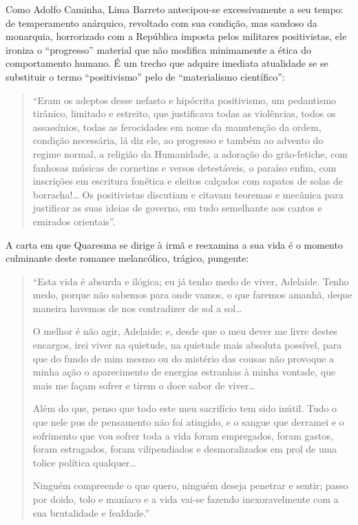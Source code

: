 \documentclass[
  letterpaper,
  DIV=11,
  numbers=noendperiod]{scrreprt}
\begin{document}
Como Adolfo Caminha, Lima Barreto antecipou-se excessivamente a seu
tempo: de temperamento anárquico, revoltado com sua condição, mas
saudoso da monarquia, horrorizado com a República imposta pelos
militares positivistas, ele ironiza o ``progresso'' material que não
modifica minimamente a ética do comportamento humano. É um trecho que
adquire imediata atualidade se se substituir o termo ``positivismo''
pelo de ``materialismo científico'':

\begin{quote}
``Eram os adeptos desse nefasto e hipócrita positivismo, um pedantismo
tirânico, limitado e estreito, que justificava todas as violências,
todos os assassínios, todas as ferocidades em nome da manutenção da
ordem, condição necessária, lá diz ele, ao progresso e também ao advento
do regime normal, a religião da Humanidade, a adoração do grão-fetiche,
com fanhosas músicas de cornetins e versos detestáveis, o paraíso enfim,
com inscrições em escritura fonética e eleitos calçados com sapatos de
solas de borracha!\ldots{} Os positivistas discutiam e citavam teoremas
e mecânica para justificar as suas ideias de governo, em tudo semelhante
aos cantos e emirados orientais''.
\end{quote}

A carta em que Quaresma se dirige à irmã e reexamina a sua vida é o
momento culminante deste romance melancólico, trágico, pungente:

\begin{quote}
``Esta vida é absurda e ilógica; eu já tenho medo de viver, Adelaide.
Tenho medo, porque não sabemos para onde vamos, o que faremos amanhã,
deque maneira havemos de nos contradizer de sol a sol\ldots~

O melhor é não agir, Adelaide; e, desde que o meu dever me livre destes
encargos, irei viver na quietude, na quietude mais absoluta possível,
para que do fundo de mim mesmo ou do mistério das cousas não provoque a
minha ação o aparecimento de energias estranhas à minha vontade, que
mais me façam sofrer e tirem o doce sabor de viver\ldots~

Além do que, penso que todo este meu sacrifício tem sido inútil. Tudo o
que nele pus de pensamento não foi atingido, e o sangue que derramei e o
sofrimento que vou sofrer toda a vida foram empregados, foram gastos,
foram estragados, foram vilipendiados e desmoralizados em prol de uma
tolice política qualquer\ldots~

Ninguém compreende o que quero, ninguém deseja penetrar e sentir; passo
por doido, tolo e maníaco e a vida vai-se fazendo inexoravelmente com a
sua brutalidade e fealdade.''
\end{quote}
\end{document}
